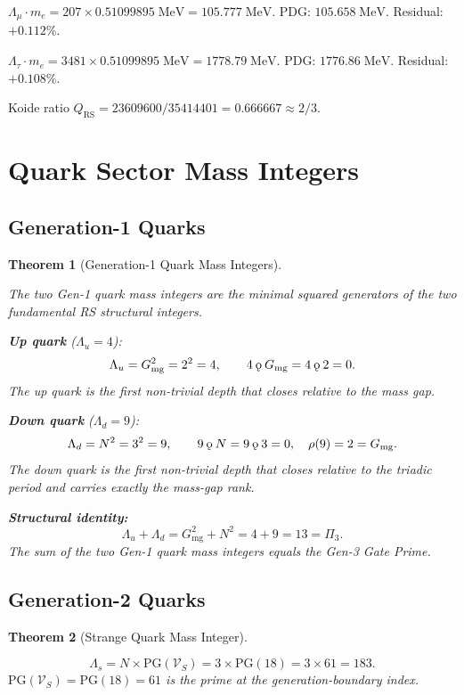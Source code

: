 \documentclass[11pt,letterpaper]{article}
\theoremstyle{plain}
\newtheorem{theorem}{Theorem}[section]
\theoremstyle{definition}
\theoremstyle{remark}
\newcommand{\rank}{\rho}
\newcommand{\koppa}{\mathbin{\text{\rm\k{o}}}}
\newcommand{\VS}{\mathcal{V}_S}
\newcommand{\PG}{\mathrm{PG}}
\newcommand{\Gmg}{G_{\mathrm{mg}}}
\newcommand{\Pithree}{\Pi_3}
\newcommand{\Lambdamu}{\Lambda_\mu}
\newcommand{\Lambdatau}{\Lambda_\tau}
\begin{document}
\begin{verifybox}
$\Lambdamu\cdot m_e=207\times0.51099895\;\mathrm{MeV}=105.777\;\mathrm{MeV}$.
PDG: $105.658\;\mathrm{MeV}$.  Residual: $+0.112\%$.

$\Lambdatau\cdot m_e=3481\times0.51099895\;\mathrm{MeV}=1778.79\;\mathrm{MeV}$.
PDG: $1776.86\;\mathrm{MeV}$.  Residual: $+0.108\%$.

Koide ratio $Q_{\mathrm{RS}}=23609600/35414401=0.666667\approx2/3$.
\end{verifybox}

\section{Quark Sector Mass Integers}\label{sec:quarks}

\subsection{Generation-1 Quarks}

\begin{theorem}[Generation-1 Quark Mass
Integers]\label{thm:gen1quarks}
\begin{rsbox}
The two Gen-1 quark mass integers are the minimal squared generators
of the two fundamental RS structural integers.

\medskip\noindent\textbf{Up quark} ($\Lambda_u=4$):
\[
\Lambda_u=\Gmg^2=2^2=4,\qquad
4\koppa\Gmg=4\koppa2=0.
\]
The up quark is the first non-trivial depth that closes relative to
the mass gap.

\medskip\noindent\textbf{Down quark} ($\Lambda_d=9$):
\[
\Lambda_d=N^2=3^2=9,\qquad
9\koppa N=9\koppa3=0,\quad\rank(9)=2=\Gmg.
\]
The down quark is the first non-trivial depth that closes relative
to the triadic period and carries exactly the mass-gap rank.

\medskip\noindent\textbf{Structural identity:}
\[
\Lambda_u+\Lambda_d=\Gmg^2+N^2=4+9=13=\Pithree.
\]
The sum of the two Gen-1 quark mass integers equals the Gen-3 Gate
Prime.
\end{rsbox}
\end{theorem}

\subsection{Generation-2 Quarks}

\begin{theorem}[Strange Quark Mass Integer]\label{thm:strange}
\begin{rsbox}
\[
\Lambda_s=N\times\PG(\VS)=3\times\PG(18)=3\times61=183.
\]
$\PG(\VS)=\PG(18)=61$ is the prime at the generation-boundary index.
\end{rsbox}
\end{theorem}
\end{document}
